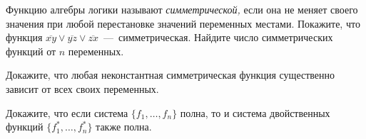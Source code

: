 \begin{exercise}
Функцию алгебры логики называют \textit{симметрической,} если она не 
	меняет своего значения при любой перестановке значений переменных местами.
	Покажите, что функция $\overline{xy}\vee\overline{yz}\vee\overline{zx}$~---~симметрическая.
	Найдите число симметрических функций от $n$ переменных.
\end{exercise}

\begin{solution}
\end{solution}

\begin{exercise}
Докажите, что любая неконстантная симметрическая функция существенно зависит
от всех своих переменных.
\end{exercise}

\begin{solution}
\end{solution}

\begin{exercise}
Докажите, что если система $\{f_1,\ldots,f_n\}$ полна, то и система
двойственных функций $\{f_1^*, \ldots, f_n^*\}$ также полна.
\end{exercise}

\begin{solution}
\end{solution}

